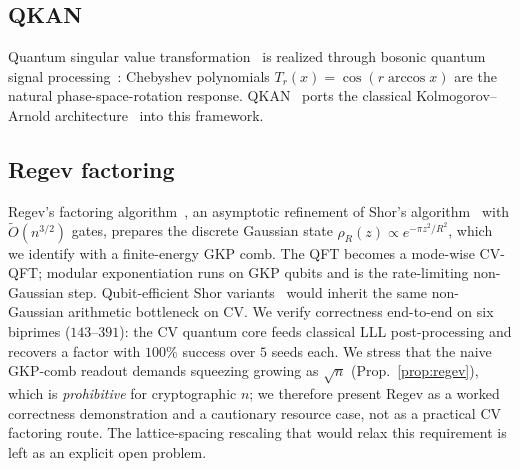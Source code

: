 \documentclass[12pt]{iopart}
\begin{document}
\subsection{QKAN}
Quantum singular value transformation~\cite{Low2017,Gilyen2019} is realized
through bosonic quantum signal processing~\cite{Rossi2022}: Chebyshev
polynomials $T_r(x)=\cos(r\arccos x)$ are the natural phase-space-rotation
response. QKAN~\cite{Ivashkov2024} ports the classical Kolmogorov--Arnold
architecture~\cite{Liu2024} into this framework.

\subsection{Regev factoring}
Regev's factoring algorithm~\cite{Regev2023}, an asymptotic refinement of
Shor's algorithm~\cite{Shor1997} with $\tilde O(n^{3/2})$ gates,
prepares the discrete Gaussian state
$\rho_R(z)\propto e^{-\pi z^2/R^2}$, which we identify with a
finite-energy GKP comb. The QFT becomes a mode-wise CV-QFT; modular
exponentiation runs on GKP qubits and is the rate-limiting non-Gaussian
step. Qubit-efficient Shor variants~\cite{Beauregard2003} would inherit
the same non-Gaussian arithmetic bottleneck on CV.
We verify correctness end-to-end on six biprimes ($143$--$391$): the CV
quantum core feeds classical LLL post-processing and recovers a factor with
$100\%$ success over $5$ seeds each. We stress that the naive GKP-comb readout
demands squeezing growing as $\sqrt{n}$ (Prop.~\ref{prop:regev}), which is
\emph{prohibitive} for cryptographic $n$; we therefore present Regev as a
worked correctness demonstration and a cautionary resource case, not as a
practical CV factoring route. The lattice-spacing rescaling that would relax
this requirement is left as an explicit open problem.
\end{document}
